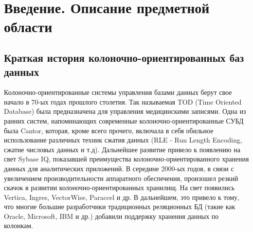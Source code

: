 \documentclass{matmex-diploma}
\begin{document}
\maketitle
\tableofcontents
\section*{Введение. Описание предметной области}

\subsection{Краткая история колоночно-ориентированных баз данных}
    Колоночно-ориентированные системы управления базами данных берут свое начало в 70-ых годах прошлого столетия. Так называемая TOD (Time Oriented Database) была предназначена для управления медицинскими записями. Одна из ранних систем, напоминающих современные колоночно-ориентированные СУБД была Cantor, которая, кроме всего прочего, включала в себя обильное использование различных техник сжатия данных (RLE - Run Length Encoding, сжатие числовых данных и т.д). Дальнейшее развитие привело к появлению на свет Sybase IQ, показавшей преимущества колоночно-ориентированного хранения данных для аналитических приложений. В середине 2000-ых годов, в связи с увеличением производительности аппаратного обеспечения, произошел резкий скачок в развитии колоночно-ориентированных хранилищ. На свет появились Vertica, Ingres, VectorWise, Paraccel и др. В дальнейшем, это привело к тому, что многие большие разработчики традиционных реляционных БД (такие как Oracle, Microsoft, IBM и др.) добавили поддержку хранения данных по колонкам.
\end{document}
